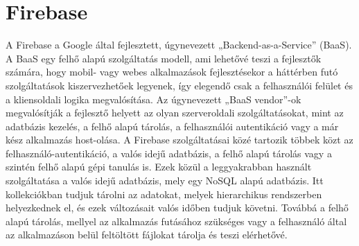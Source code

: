 \documentclass[12pt]{report}
\begin{document}
\section{Firebase}
A Firebase a Google által fejlesztett, úgynevezett „Backend-as-a-Service” (BaaS).
A BaaS egy felhő alapú szolgáltatás modell, ami lehetővé teszi a fejlesztők számára, hogy mobil- vagy webes alkalmazások fejlesztésekor a háttérben futó szolgáltatások kiszervezhetőek legyenek, így elegendő csak a felhasználói felület és a kliensoldali logika megvalósítása. Az úgynevezett „BaaS vendor”-ok megvalósítják a fejlesztő helyett az olyan szerveroldali szolgáltatásokat, mint az adatbázis kezelés, a felhő alapú tárolás, a felhasználói autentikáció vagy a már kész alkalmazás host-olása.
A Firebase szolgáltatásai közé tartozik többek közt az felhasználó-autentikáció, a valós idejű adatbázis, a felhő alapú tárolás vagy a szintén felhő alapú gépi tanulás is.
Ezek közül a leggyakrabban használt szolgáltatása a valós idejű adatbázis, mely egy NoSQL alapú adatbázis. Itt kollekciókban tudjuk tárolni az adatokat, melyek hierarchikus rendszerben helyezkednek el, és ezek változásait valós időben tudjuk követni. Továbbá a felhő alapú tárolás, mellyel az alkalmazás futásához szükséges vagy a felhasználó által az alkalmazáson belül feltöltött fájlokat tárolja és teszi elérhetővé.
\end{document}
